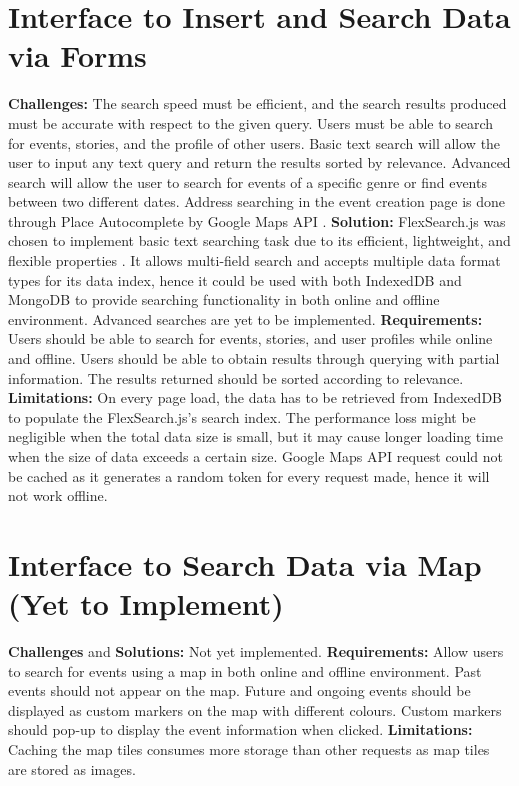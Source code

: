 \documentclass[11pt, a4paper]{article}
\begin{document}
\section{Interface to Insert and Search Data via Forms}
\textbf{Challenges:} The search speed must be efficient, and the search results produced must be
accurate with respect to the given query. Users must be able to search for events, stories, and the
profile of other users. Basic text search will allow the user to input any text query and return the
results sorted by relevance. Advanced search will allow the user to search for events of a specific
genre or find events between two different dates. Address searching in the event creation page is
done through Place Autocomplete by Google Maps API \cite{google_maps_api}. \textbf{Solution:}
FlexSearch.js \cite{flexsearch} was chosen to implement basic text searching task due to its
efficient, lightweight, and flexible properties \cite{flexsearch_benchmarkk}. It allows multi-field
search and accepts multiple data format types for its data index, hence it could be used with both
IndexedDB and MongoDB to provide searching functionality in both online and offline environment.
Advanced searches are yet to be implemented. \textbf{Requirements:} Users should be able to search
for events, stories, and user profiles while online and offline. Users should be able to obtain
results through querying with partial information. The results returned should be sorted according
to relevance. \textbf{Limitations:} On every page load, the data has to be retrieved from IndexedDB
to populate the FlexSearch.js's search index. The performance loss might be negligible when the
total data size is small, but it may cause longer loading time when the size of data exceeds a
certain size. Google Maps API request could not be cached as it generates a random token for every
request made, hence it will not work offline.

\section{Interface to Search Data via Map (Yet to Implement)}
\textbf{Challenges} and \textbf{Solutions:} Not yet implemented. \textbf{Requirements:} Allow users
to search for events using a map in both online and offline environment. Past events should not
appear on the map. Future and ongoing events should be displayed as custom markers on the map with
different colours. Custom markers should pop-up to display the event information when clicked.
\textbf{Limitations:} Caching the map tiles consumes more storage than other requests as map tiles
are stored as images.
\end{document}
